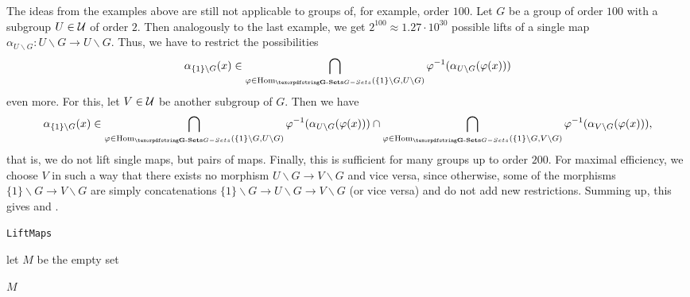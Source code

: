 \begin{rem}\label{rem:take_pairs}
The ideas from the examples above are still not applicable to groups of, for example, order $100$. Let $G$ be a group of order $100$ with a subgroup $U \in \mathcal{U}$ of order $2$. Then analogously to the last example, we get $2^{100} \approx 1.27 \cdot 10^{30}$ possible lifts of a single map $\alpha_{U \backslash G}\colon U \backslash G \to U \backslash G$. Thus, we have to restrict the possibilities \[\alpha_{\{1\} \backslash G}(x) \in \bigcap_{\phi \in \Hom_\Gset(\{1\} \backslash G,U \backslash G)}\phi\inv(\alpha_{U \backslash G}(\phi(x)))\] even more. For this, let $V \in \mathcal{U}$ be another subgroup of $G$. Then we have \[\alpha_{\{1\} \backslash G}(x) \in \bigcap_{\phi \in \Hom_\Gset(\{1\} \backslash G,U \backslash G)}\phi\inv(\alpha_{U \backslash G}(\phi(x))) \cap \bigcap_{\phi \in \Hom_\Gset(\{1\} \backslash G,V \backslash G)}\phi\inv(\alpha_{V \backslash G}(\phi(x))),\] that is, we do not lift single maps, but pairs of maps. Finally, this is sufficient for many groups up to order $200$. For maximal efficiency, we choose $V$ in such a way that there exists no morphism $U \backslash G \to V \backslash G$ and vice versa, since otherwise, some of the morphisms $\{1\} \backslash G \to V \backslash G$ are simply concatenations $\{1\} \backslash G \to U \backslash G \to V \backslash G$ (or vice versa) and do not add new restrictions. Summing up, this gives  and .
\end{rem}

\begin{algorithm}\capstart
    \caption{\texttt{LiftMaps}}\label{algo:LiftMaps}
	\BlankLine
	let $M$ be the empty set\;
	
	\Return $M$\;
\end{algorithm}

